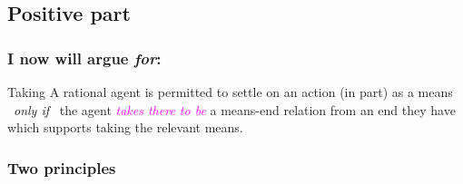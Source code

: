 \documentclass[noamssymb,
]{beamer} %
\begin{document}
\subsection{Positive part}
\label{sec:positive}

\begin{frame}
  \frametitle{I now will argue \emph{for}:}

  \begin{block}{Taking}
    A rational agent is permitted to settle on an action (in part) as a means
    \newline
    \mbox{ }\hfill\emph{only if}\hfill\mbox{ }
    \newline
    the agent \textcolor{fuchsia}{\emph{takes there to be}} a means-end relation from an end they have which supports taking the relevant means.
  \end{block}
\end{frame}

\subsubsection{Two principles}
\label{sec:two-principles}
\end{document}
